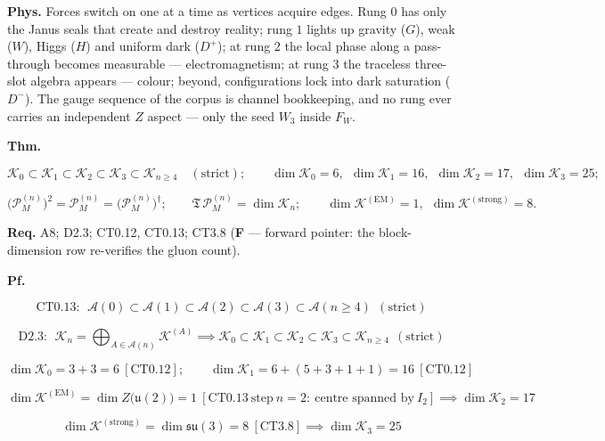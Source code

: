 \begin{theorem}
\textbf{Phys.} Forces switch on one at a time as vertices acquire edges. Rung $0$ has only the Janus seals that create and destroy reality; rung $1$ lights up gravity ($G$), weak ($W$), Higgs ($H$) and uniform dark ($D^+$); at rung $2$ the local phase along a pass-through becomes measurable — electromagnetism; at rung $3$ the traceless three-slot algebra appears — colour; beyond, configurations lock into dark saturation ($D^-$). The gauge sequence of the corpus is channel bookkeeping, and no rung ever carries an independent $Z$ aspect — only the seed $W_3$ inside $F_W$.

\end{theorem}

\begin{theorem}\label{tag:CT0-14}
\textbf{Thm.}

\[
\mathcal K_0\subset\mathcal K_1\subset\mathcal K_2\subset\mathcal K_3\subset\mathcal K_{n\ge4}\quad(\text{strict});\qquad
\dim\mathcal K_0=6,\ \ \dim\mathcal K_1=16,\ \ \dim\mathcal K_2=17,\ \ \dim\mathcal K_3=25;
\]

\[
\bigl(\mathcal P_M^{(n)}\bigr)^2=\mathcal P_M^{(n)}=\bigl(\mathcal P_M^{(n)}\bigr)^\dagger;\qquad
\mathfrak T\,\mathcal P_M^{(n)}=\dim\mathcal K_n;\qquad
\dim\mathcal K^{(\mathrm{EM})}=1,\ \ \dim\mathcal K^{(\mathrm{strong})}=8 .
\]

\textbf{Req.} A8; D2.3; CT0.12, CT0.13; CT3.8 (\textbf{F} — forward pointer: the block-dimension row re-verifies the gluon count).

\textbf{Pf.}

\[
\mathrm{CT0.13}:\ \ \mathcal A(0)\subset\mathcal A(1)\subset\mathcal A(2)\subset\mathcal A(3)\subset\mathcal A(n\ge4)\ \ (\text{strict})
\]

\[
\mathrm{D2.3}:\ \ \mathcal K_n=\bigoplus_{A\in\mathcal A(n)}\mathcal K^{(A)}\implies\mathcal K_0\subset\mathcal K_1\subset\mathcal K_2\subset\mathcal K_3\subset\mathcal K_{n\ge4}\ \ (\text{strict})
\]

\[
\dim\mathcal K_0=3+3=6\ [\mathrm{CT0.12}];\qquad
\dim\mathcal K_1=6+(5+3+1+1)=16\ [\mathrm{CT0.12}]
\]

\[
\dim\mathcal K^{(\mathrm{EM})}=\dim Z\bigl(\mathfrak u(2)\bigr)=1\ [\mathrm{CT0.13}\ \text{step}\ n{=}2:\ \text{centre spanned by}\ I_2]\implies\dim\mathcal K_2=17
\]

\[
\dim\mathcal K^{(\mathrm{strong})}=\dim\mathfrak{su}(3)=8\ [\mathrm{CT3.8}]\implies\dim\mathcal K_3=25
\]


\end{theorem}
